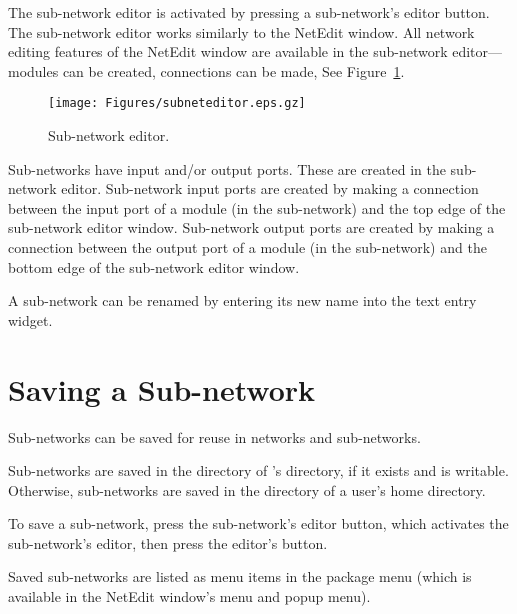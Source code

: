 \newcommand{\subneteditorfig}{%
  \centerline{\texttt{[image: Figures/subneteditor.eps.gz]}}
}
\begin{htmlonly}
  \newcommand{\subneteditorfig}{%
    \htmladdimg[alt="Sub-net editor"]{../Figures/subneteditor.gif}
  }
\end{htmlonly}

The sub-network editor is activated by pressing a sub-network's editor
button.  The sub-network editor works similarly to the NetEdit window.
All network editing features of the NetEdit window are available in
the sub-network editor---modules can be created, connections can be
made, \etc{} See Figure~\ref{fig:subneteditor}.

\begin{figure}[htb]
  \centering
  \begin{makeimage} \end{makeimage}
  \subneteditorfig
  \caption{\label{fig:subneteditor} Sub-network editor.}
\end{figure}

Sub-networks have input and/or output ports.  These are created in the
sub-network editor.  Sub-network input ports are created by making a
connection between the input port of a module (in the sub-network) and
the top edge of the sub-network editor window.  Sub-network output
ports are created by making a connection between the output port of a
module (in the sub-network) and the bottom edge of the sub-network
editor window.

A sub-network can be renamed by entering its new name into the
 text entry widget.

\section{Saving a Sub-network}
\label{sec:savesubnet}

Sub-networks can be saved for reuse in networks and sub-networks.

Sub-networks are saved in the  directory of \sr{}'s
 directory, if it exists and is writable.  Otherwise,
sub-networks are saved in the  directory of a
user's home directory.

To save a sub-network, press the sub-network's editor
button, which activates the sub-network's editor, then press the
editor's  button.

Saved sub-networks are listed as menu items in the 
package menu (which is available in the NetEdit window's 
menu and popup menu).

